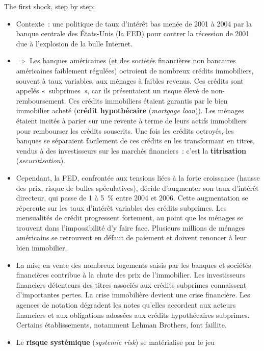 \begin{example}
  The first shock, step by step:
\begin{itemize}
  \item Contexte~: une politique de taux d'intérêt bas menée de 2001 à 2004 par la
    banque centrale des États-Unis (la FED) pour contrer la récession de 2001 due à
    l'explosion de la bulle Internet.
  \item $\Rightarrow$ Les banques américaines (et des sociétés financières non bancaires
    américaines faiblement régulées) octroient de nombreux crédits immobiliers, souvent
    à taux variables, aux ménages à faibles revenus. Ces crédits sont appelés
    «~subprimes~», car ils présentaient un risque élevé de non-remboursement. Ces
    crédits immobiliers étaient garantis par le bien immobilier acheté (\textbf{crédit
    hypothécaire} (\textit{mortgage loan})). Les ménages étaient incités à parier sur
    une revente à terme de leurs actifs immobiliers pour rembourser les crédits
    souscrits. Une fois les crédits octroyés, les banques se séparaient facilement de
    ces crédits en les transformant en titres, vendus à des investisseurs sur les
    marchés financiers~: c'est la \textbf{titrisation} (\textit{securitisation}).
  \item Cependant, la FED, confrontée aux tensions liées à la forte croissance (hausse
    des prix, risque de bulles spéculatives), décide d'augmenter son taux d'intérêt
    directeur, qui passe de 1 à 5~\% entre 2004 et 2006. Cette augmentation se
    répercute sur les taux d'intérêt variables des crédits subprimes. Les mensualités
    de crédit progressent fortement, au point que les ménages se trouvent dans
    l'impossibilité d'y faire face. Plusieurs millions de ménages américains se
    retrouvent en défaut de paiement et doivent renoncer à leur bien immobilier.
  \item La mise en vente des nombreux logements saisis par les banques et sociétés
    financières contribue à la chute des prix de l'immobilier. Les investisseurs
    financiers détenteurs des titres associés aux crédits subprimes connaissent
    d'importantes pertes. La crise immobilière devient une crise financière. Les
    agences de notation dégradent les notes qu'elles accordent aux acteurs financiers
    et aux obligations adossées aux crédits hypothécaires subprimes. Certains
    établissements, notamment Lehman Brothers, font faillite.
  \item Le \textbf{risque systémique} (\textit{systemic risk}) se matérialise par le jeu

\end{itemize}
\end{example}
